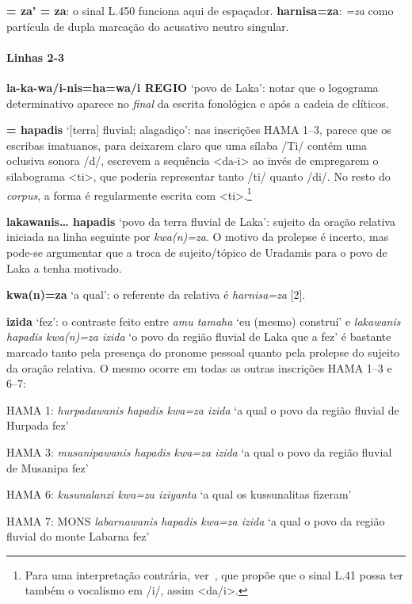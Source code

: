 \noindent{} \textbf{= za' = za}: o sinal L.450  funciona
aqui de espaçador.
\textbf{harnisa=za}: \emph{=za} como partícula de dupla marcação do acusativo
neutro singular.

\paragraph{Linhas 2-3}
\textbf{la-ka-wa/i-nis=ha=wa/i REGIO} `povo de Laka': notar que o logograma
determinativo aparece no \emph{final} da escrita fonológica e após a cadeia de
clíticos.

\noindent{} \textbf{= hapadis} `[terra] fluvial;
alagadiço': nas inscrições HAMA 1--3, parece que os escribas imatuanos,
para deixarem claro que uma sílaba /Ti/ contém uma oclusiva sonora /d/,
escrevem a sequência  <da-i> ao invés de empregarem o
silabograma  <ti>, que poderia representar tanto /ti/ quanto
/di/. No resto do \emph{corpus}, a forma é regularmente escrita com
 <ti>.\footnote{
	Para uma interpretação contrária, ver~\citet{Simon2019}, que propõe que o
	sinal L.41 possa ter também o vocalismo em /i/, assim <da/i>.
}

\noindent\textbf{lakawanis\ldots{} hapadis} `povo da terra fluvial de Laka': sujeito da
oração relativa iniciada na linha seguinte por \emph{kwa{(n)}=za}.
O motivo da prolepse é incerto, mas pode-se argumentar que a troca de
sujeito\slash{}tópico de Uradamis para o povo de Laka a tenha motivado.

\noindent\textbf{kwa{(n)}=za} `a qual': o referente da relativa é \emph{harnisa=za}
[2].

\noindent\textbf{izida} `fez': o contraste feito entre \emph{amu tamaha} `eu (mesmo)
construí' e \emph{lakawanis hapadis kwa{(n)}=za izida} `o povo da região
fluvial de Laka que a fez' é bastante marcado tanto pela presença do pronome
pessoal quanto pela prolepse do sujeito da oração relativa.
O mesmo ocorre em todas as outras inscrições HAMA 1--3 e 6--7:
\begin{compactitem}
	\item HAMA 1: \emph{hurpadawanis hapadis kwa=za izida} `a qual o povo da região
	fluvial de Hurpada fez'
	\item HAMA 3: \emph{musanipawanis hapadis kwa=za izida} `a qual o povo da região
	fluvial de Musanipa fez'
	\item HAMA 6: \emph{kusunalanzi kwa=za iziyanta} `a qual os kussunalitas fizeram'
	\item HAMA 7: MONS \emph{labarnawanis hapadis kwa=za izida} `a qual o
	povo da região fluvial do monte Labarna fez'
\end{compactitem}

